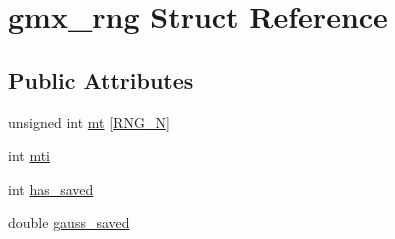 \hypertarget{structgmx__rng}{\section{gmx\-\_\-rng \-Struct \-Reference}
\label{structgmx__rng}
}
\subsection*{\-Public \-Attributes}
\begin{DoxyCompactItemize}
\item 
unsigned int \hyperlink{structgmx__rng_a11c217d8fe195f4a4c674d08db70371f}{mt} \mbox{[}\hyperlink{gmx__random_8c_a4b2478588a242ecc9c9f8663ba4bf633}{\-R\-N\-G\-\_\-\-N}\mbox{]}
\item 
int \hyperlink{structgmx__rng_a41008c4b3785fa5ec5977eaa2e60a2c1}{mti}
\item 
int \hyperlink{structgmx__rng_a59b7a4e9bf9bd8ea07b2c1e42faf6d3b}{has\-\_\-saved}
\item 
double \hyperlink{structgmx__rng_ada049c9ea022ddbe17e52e38f6c0d0f1}{gauss\-\_\-saved}
\end{DoxyCompactItemize}


